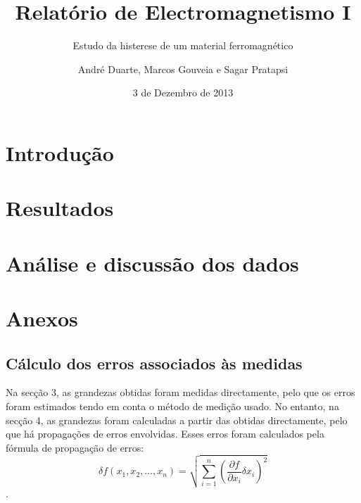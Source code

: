 \documentclass[a4paper]{article}
\title{Relatório de Electromagnetismo I}
\subtitle{Estudo da histerese de um material ferromagnético}
\author{André Duarte, Marcos Gouveia e Sagar Pratapsi}
\date{3 de Dezembro de 2013}
\begin{document}
\maketitle

\section{Introdução}
\section{Resultados}

\section{Análise e discussão dos dados}
\section{Anexos}
\subsection{Cálculo dos erros associados às medidas}
Na secção 3, as grandezas obtidas foram medidas directamente, pelo que os erros foram estimados tendo em conta o método de medição usado. No entanto, na secção 4, as grandezas foram calculadas a partir das obtidas directamente, pelo que há propagações de erros envolvidas. Esses erros foram calculados pela fórmula de propagação de erros: \begin{equation} \delta f(x_1,x_2,\ldots,x_n)=\sqrt{\sum_{i=1}^{n}\left( \frac{\partial f}{\partial x_i}\delta x_i \right)^2}\end{equation}.
\end{document}
